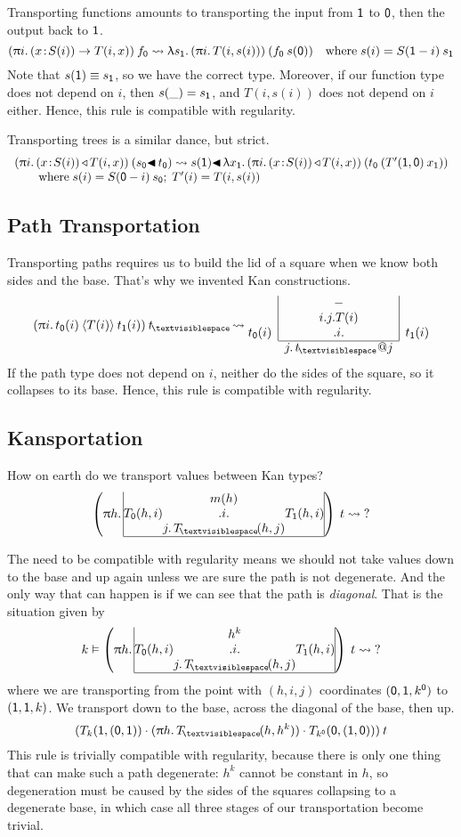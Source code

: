 \documentclass{article}
\makeatletter
\newcommand{\hb}{\!:\!}
\newcommand{\PI}[2]{\blue{(}#1\hb #2\blue{)\to\;}}
\newcommand{\WW}[2]{\blue{(}#1\hb #2\blue{)\,\triangleleft\,}}
\newcommand{\PATH}[3]{#2\mathbin{\blue{\langle}#1\blue{\rangle}}#3}
\newcommand{\la}[1]{\red{\uplambda}#1.\,}
\newcommand{\tr}{\red{\blacktriangleleft}\,}
\newcommand{\pa}[1]{\red{\uppi}#1.\,}
\newcommand{\ze}{{\orange{\mathsf{0}}}}
\newcommand{\un}{{\orange{\mathsf{1}}}}
\newcommand{\base}{{\!\orange{\textvisiblespace}\!}}
\newcommand{\pj}{\,\orange{@}}
\newcommand{\KAN}[6]{\blue{\begin{array}{|@{}r@{}c@{}l@{}|}
                        & \black{#6} & \\
                     \black{#2} & \black{.#1.} & \black{#3} \\
                        & \black{#4.\,#5} & \\
                      \hline
                     \end{array}}}
\newcommand{\hkan}[7]{\green{\begin{array}{@{}r|@{}c@{}|l@{}}
                        & \black{#7} & \\
                        & \black{#1} &\\
                     \black{#3} & \black{.#2.} & \black{#4} \\
                        \cline{2-2}
               \multicolumn{1}{r}{}         & \multicolumn{1}{c}{\black{#5.\,#6}} & \\
                     \end{array}}}
\makeatother
\begin{document}
Transporting functions amounts to transporting the input from $\un$
to $\ze$, then the output back to $\un$.
\[
(\pa i \PI x {S(i)}{T(i,x)})\:f_\ze \leadsto
  \la {s_\un} (\pa i {T(i, s(i))})\:(f_\ze\:s(\ze))\quad
  \mbox{where}\;s(i) = S(\un-i)\:s_\un
\]
Note that $s(\un)\equiv s_\un$, so we have the correct type. Moreover,
if our function type does not depend on $i$, then $s(\_)=s_\un$,
and $T(i,s(i))$ does not depend on $i$ either. Hence, this rule
is compatible with regularity.

Transporting trees is a similar dance, but strict.
\[\begin{array}{l}
(\pa i \WW x {S(i)}{T(i,x)})\:(s_\ze\tr t_\ze) \leadsto
  s(\un)\tr \la {x_\un} (\pa i \WW x
  {S(i)}{T(i,x)})\:(t_\ze\:(T'(\un,\ze)\:x_\un))
\\ \qquad\mbox{where}\; s(i)=S(\ze-i)\:s_\ze;\;
  T'(i) = T(i, s(i))
\end{array}\]


\subsection{Path Transportation}

Transporting paths requires us to build the lid of a square when we
know both sides and the base. That's why we invented Kan
constructions.
\[
(\pa i \PATH{T(i)}{t_\ze(i)}{t_\un(i)})\:t_\base \leadsto
\hkan{i.j.T(i)}i{t_\ze(i)}{t_\un(i)}j{t_\base\pj j}{-}
\]
If the path type does not depend on $i$, neither do the sides of the
square, so it collapses to its base. Hence, this rule is compatible
with regularity.


\subsection{Kansportation}

How on earth do we transport values between Kan types?
\[
\left(\pa h \KAN i{T_\ze(h,i)}{T_\un(h,i)}j{T_\base(h,j)}{m(h)}\right)\:t \leadsto \;?
\]

The need to be compatible with regularity means we should not take
values down to the base and up again unless we are sure the path is
not degenerate. And the only way that can happen is if we can see
that the path is \emph{diagonal}. That is the situation given by
\[
k\vDash \left(\pa h \KAN i{T_\ze(h,i)}{T_\un(h,i)}j{T_\base(h,j)}{h^k}\right)\:t \leadsto \;?
\]
where we are transporting from the point with $(h,i,j)$ coordinates
$(\ze,\un,k^\ze)$ to $(\un,\un,k)$. We transport down to the base,
across the diagonal of the base, then up.
\[
 (T_{k}(\un,(\ze,\un)) \cdot (\pa h T_\base(h,h^k)) \cdot T_{k^\ze}(\ze,(\un,\ze)))\:t
\]
This rule is trivially compatible with regularity, because there is
only one thing that can make such a path degenerate: $h^k$ cannot be constant
in $h$, so degeneration must be caused by the sides of the squares
collapsing to a degenerate base, in which case all three stages of our
transportation become trivial.
\end{document}
